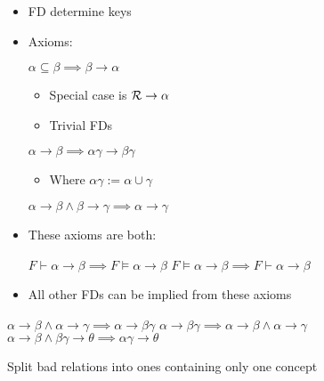 \begin{itemize}
\begin{itemize}
    \item FD determine keys
        \end{itemize}
        \begin{itemize}
            \item Axioms:
                \begin{itemize}
                     $\alpha \subseteq \beta \implies \beta \to \alpha$
                        \begin{itemize}
                            \item Special case is $\mathcal{R} \to \alpha$
                            \item Trivial FDs
                        \end{itemize}
                     $\alpha \to \beta \implies \alpha \gamma \to \beta \gamma$
                        \begin{itemize}
                            \item Where $\alpha \gamma := \alpha \cup \gamma$
                        \end{itemize}
                     $\alpha \to \beta \wedge \beta \to \gamma \implies \alpha \to \gamma$
                \end{itemize}
            \item These axioms are both:
                \begin{itemize}
                     $F \vdash \alpha \to \beta \implies F \models \alpha \to \beta$
                     $F \models \alpha \to \beta \implies F \vdash \alpha \to \beta$
                \end{itemize}
            \item All other FDs can be implied from these axioms
        \end{itemize}
        \begin{itemize}
             $\alpha \to \beta \wedge \alpha \to \gamma \implies \alpha \to \beta \gamma$
             $\alpha \to \beta \gamma \implies \alpha \to \beta \wedge \alpha \to \gamma$
             $\alpha \to \beta \wedge \beta \gamma \to \theta \implies \alpha \gamma \to \theta$
        \end{itemize}
        \begin{itemize}
             Split bad relations into ones containing only one concept

\end{itemize}
\end{itemize}
